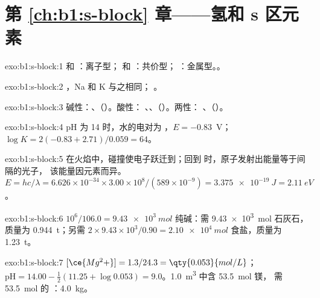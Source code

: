 \section*{第 \ref{ch:b1:s-block} 章——氢和 s 区元素}

\begin{solution}{exo:b1:s-block:1}
 和 ：离子型； 和 ：共价型；
：金属型。。
\end{solution}

\begin{solution}{exo:b1:s-block:2}
，Na 和 K 与之相同；
。
\end{solution}

\begin{solution}{exo:b1:s-block:3}
碱性：、（）。酸性：
、、（）。两性：
、（）。
\end{solution}

\begin{solution}{exo:b1:s-block:4}
pH 为 14 时，水的电对为 ，$E = -0.83$~V；
$\log K = 2(-0.83 + 2.71)/0.059 = 64$。
\end{solution}

\begin{solution}{exo:b1:s-block:5}
在火焰中，碰撞使电子跃迁到；回到
时，原子发射出能量等于间隔的光子，
该能量因元素而异。$E = hc/\lambda = 6.626 \times 10^{-34} \times
3.00 \times 10^8/(589 \times 10^{-9}) = \qty{3.375e-19}{J} = \qty{2.11}{eV}$。
\end{solution}

\begin{solution}{exo:b1:s-block:6}
$10^6/106.0 = \qty{9.43e3}{mol}$ 纯碱：需 \qty{9.43e3}{mol}
石灰石，质量为 \qty{0.944}{t}；另需 $2 \times 9.43 \times 10^3/0.90 =
\qty{2.10e4}{mol}$ 食盐，质量为 \qty{1.23}{t}。
\end{solution}

\begin{solution}{exo:b1:s-block:7}
$[\ce{Mg^2+}] = 1.3/24.3 = \qty{0.053}{mol/L}$；$\mathrm{pH} = 14.00 -
\frac12(11.25 + \log 0.053) = 9.0$。\qty{1.0}{m^3} 中含 \qty{53.5}{mol} 镁，
需 \qty{53.5}{mol} 的 ：\qty{4.0}{kg}。
\end{solution}

